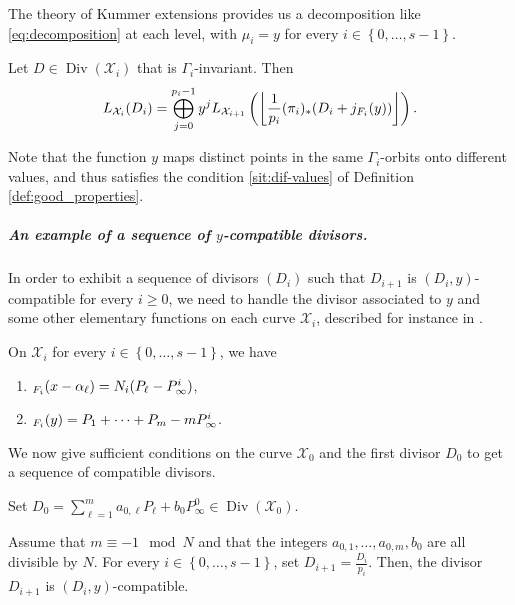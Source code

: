 \documentclass[10pt,a4paper]{article}
\newcommand\floor[1]{\left\lfloor #1 \right\rfloor}
\DeclareMathOperator{\Div}{Div}
\let\div\relax\DeclareMathOperator{\div}{div}
\newcommand{\set}[1]{\left\{#1\right\}}
\newcommand{\range}[1]{\set{0,\dots,#1-1}}
\newcommand\calX{\mathcal{X}}
\theoremstyle{plain}
\theoremstyle{plain}
\theoremstyle{definition}
\theoremstyle{remark}
\theoremstyle{plain}
\begin{document}
The theory of Kummer extensions provides us a decomposition like \eqref{eq:decomposition} at each level, with $\mu_i=y$ for every $i\in\range{s}$.

\begin{theorem}[{\cite[Theorem 2.2]{M04}}]\label{th:M04}
	Let $D \in \Div(\calX_i)$ that is $\Gamma_i$-invariant. Then 
	\[L_{\calX_i}(D_i)=\bigoplus_{j=0}^{p_i-1}y^j L_{\calX_{i+1}}\left(\floor{\frac{1}{p_i}(\pi_i)_*(D_i+j\div_{F_i}(y))}\right).\]
\end{theorem}

Note that the function $y$ maps distinct points in the same $\Gamma_i$-orbits onto different values, and thus satisfies the condition \ref{sit:dif-values} of Definition \ref{def:good_properties}.

\subparagraph*{An example of a sequence of $y$-compatible divisors.}

In order to exhibit a sequence of divisors $(D_i)$ such that $D_{i+1}$ is $(D_i,y)$-compatible for every $i \geq 0$, we need to handle the divisor associated to $y$ and some other elementary functions on each curve $\calX_i$, described for instance in \cite{MQS15}.

\begin{lemma}
	On $\calX_i$ for every $i \in \range{s}$, we have
	\begin{enumerate}
		\item $\div_{F_i}(x-\alpha_\ell)=N_i(P_\ell-P^i_\infty)$,
		\item $\div_{F_i}(y)=P_1+\dots+P_m - m P_\infty^i$.
	\end{enumerate}  
\end{lemma}

We now give sufficient conditions on the curve $\calX_0$ and the first divisor $D_0$ to get a sequence of compatible divisors.

\begin{lemma}\label{lem:compatible-Kummer} Set $\displaystyle{D_0= \sum_{\ell=1}^m a_{0,\ell} P_\ell + b_0 P^0_\infty \in \Div(\calX_0)}$.
	
	Assume that $m \equiv -1 \mod N$ and that the integers $a_{0,1},\dots,a_{0,m},b_{0}$ are all divisible by $N$. For every $i \in \range{s}$, set $D_{i+1}=\frac{D_i}{p_i}$. Then, the divisor $D_{i+1}$ is $(D_i,y)$-compatible.
\end{lemma}
\end{document}
